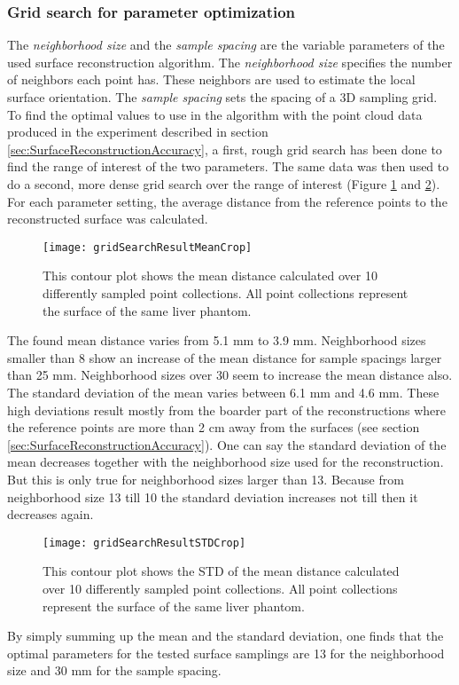 \subsubsection{Grid search for parameter optimization}
The \textit{neighborhood size} and the \textit{sample spacing} are the variable
parameters of the used surface reconstruction algorithm. The \textit{neighborhood size}
specifies the number of neighbors each point has. These neighbors are used to
estimate the local surface orientation. The \textit{sample spacing} sets the
spacing of a 3D sampling grid.
To find the optimal values to use in the algorithm with the point cloud data produced in the
experiment described in section \ref{sec:SurfaceReconstructionAccuracy}, a
first, rough grid search has been done to find the range of interest
of the two parameters. The same data was then used to do a second, more dense
grid search over the range of interest (Figure \ref{fig:gridSearchResultMean} and
\ref{fig:gridSearchResultSTD}). For each parameter setting, the average distance from the
reference points to the reconstructed surface was calculated.
\begin{figure}[h]
  \centering
 \texttt{[image: gridSearchResultMeanCrop]}
  \caption{This contour plot shows the mean distance calculated over 10
    differently sampled point collections. All point collections represent the
    surface of the same liver phantom.}
  \label{fig:gridSearchResultMean}
\end{figure}
The found mean distance varies from 5.1 mm to 3.9 mm. Neighborhood sizes smaller
than 8 show an increase of the mean distance for sample spacings larger than 25
mm. Neighborhood sizes over 30 seem to increase the mean distance also.
The standard deviation of the mean varies between 6.1 mm and 4.6 mm. These high
deviations result mostly from the boarder part of the reconstructions where the
reference points are more than 2 cm away from the surfaces (see section
\ref{sec:SurfaceReconstructionAccuracy}). One can say the standard deviation of
the mean decreases together with the neighborhood size used for the
reconstruction. But this is only true for neighborhood sizes larger than 13.
Because from neighborhood size 13 till 10 the standard deviation increases not
till then it decreases again. 
\begin{figure}[h]
  \centering
 \texttt{[image: gridSearchResultSTDCrop]}
  \caption{This contour plot shows the STD of the mean distance calculated over 10
    differently sampled point collections. All point collections represent the
    surface of the same liver phantom.}
  \label{fig:gridSearchResultSTD}
\end{figure}
By simply summing up the mean and the standard deviation, one finds that the
optimal parameters for the tested surface samplings are 13 for the neighborhood
size and 30 mm for the sample spacing.
